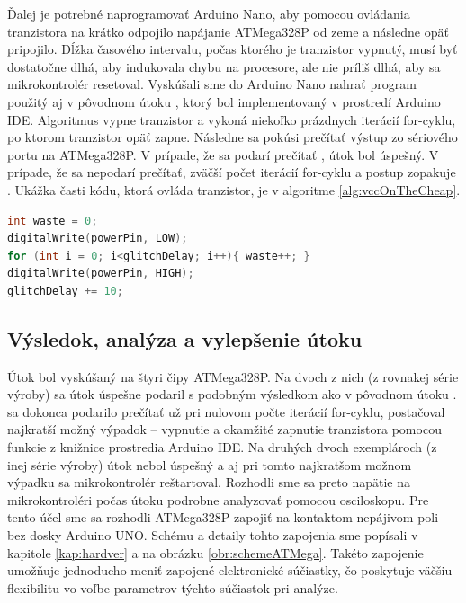 Ďalej je potrebné naprogramovať Arduino Nano, aby pomocou ovládania tranzistora na krátko odpojilo napájanie ATMega328P od zeme a následne opäť pripojilo. Dĺžka časového intervalu, počas ktorého je tranzistor vypnutý, musí byť dostatočne dlhá, aby indukovala chybu na procesore, ale nie príliš dlhá, aby sa mikrokontrolér resetoval. Vyskúšali sme do Arduino Nano nahrať program použitý aj v pôvodnom útoku \cite{vccOnTheCheap}, ktorý bol implementovaný v prostredí Arduino IDE. Algoritmus vypne tranzistor a vykoná niekoľko prázdnych iterácií for-cyklu, po ktorom tranzistor opäť zapne. Následne sa pokúsi prečítať výstup zo sériového portu na ATMega328P. V prípade, že sa podarí prečítať , útok bol úspešný. V prípade, že sa  nepodarí prečítať, zväčší počet iterácií for-cyklu a postup zopakuje \cite{vccOnTheCheap}. Ukážka časti kódu, ktorá ovláda tranzistor, je v algoritme \ref{alg:vccOnTheCheap}.

\begin{lstlisting}[float,language=C,caption={Ovládanie tranzistora, ktorý spína napájanie na ATMega328P. Prevzaté zo zdrojového kódu pôvodného útoku \cite{vccOnTheCheap}.},label=alg:vccOnTheCheap]
int waste = 0;
digitalWrite(powerPin, LOW);
for (int i = 0; i<glitchDelay; i++){ waste++; }                    
digitalWrite(powerPin, HIGH);
glitchDelay += 10;
\end{lstlisting}

\subsection{Výsledok, analýza a vylepšenie útoku}
Útok bol vyskúšaný na štyri čipy ATMega328P. Na dvoch z nich (z rovnakej série výroby) sa útok úspešne podaril s podobným výsledkom ako v pôvodnom útoku \cite{vccOnTheCheap}.  sa dokonca podarilo prečítať už pri nulovom počte iterácií for-cyklu, postačoval najkratší možný výpadok -- vypnutie a okamžité zapnutie tranzistora pomocou funkcie  z knižnice prostredia Arduino IDE. Na druhých dvoch exemplároch (z inej série výroby) útok nebol úspešný a aj pri tomto najkratšom možnom výpadku sa mikrokontrolér reštartoval. Rozhodli sme sa preto napätie na mikrokontroléri počas útoku podrobne analyzovať pomocou osciloskopu. Pre tento účel sme sa rozhodli ATMega328P zapojiť na kontaktom nepájivom poli bez dosky Arduino UNO. Schému a detaily tohto zapojenia sme popísali v kapitole \ref{kap:hardver} a na obrázku \ref{obr:schemeATMega}. Takéto zapojenie umožňuje jednoducho meniť zapojené elektronické súčiastky, čo poskytuje väčšiu flexibilitu vo voľbe parametrov týchto súčiastok pri analýze.

